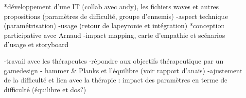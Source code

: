 	*développement d'une IT (collab avec andy), les fichiers waves et autres propositions (paramètres de difficulté, groupe d'ennemis)
		-aspect technique (paramétrisation) 
		-usage (retour de lapeyronie et intégration)
	*conception participative avec Arnaud 
		-impact mapping, carte d'empathie et scénarios d'usage et storyboard
	
	-travail avec les thérapeutes
	-répondre aux objectifs thérapeutique par un gamedesign
		- hammer \& Planks et l'équilibre (voir rapport d'anais)
	-ajustement de la difficulté et lien avec la thérapie : impact des paramètres en terme de difficulté (équilibre et dos?)
